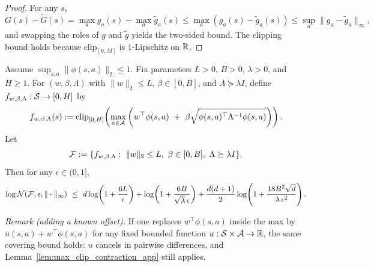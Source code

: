 \begin{proof}
For any $s$,
\[
G(s)-\tilde G(s)=\max_a g_a(s)-\max_a\tilde g_a(s)
\le \max_a (g_a(s)-\tilde g_a(s))
\le \sup_a \|g_a-\tilde g_a\|_\infty,
\]
and swapping the roles of $g$ and $\tilde g$ yields the two-sided bound.
The clipping bound holds because $\mathrm{clip}_{[0,M]}$ is $1$-Lipschitz on $\mathbb{R}$.
\end{proof}

\begin{lemma}\label{lem:cover_optimistic_value_class_app}
Assume $\sup_{s,a}\|\phi(s,a)\|_2\le 1$.
Fix parameters $L>0$, $B>0$, $\lambda>0$, and $H\ge 1$.
For $(w,\beta,\Lambda)$ with $\|w\|_2\le L$, $\beta\in[0,B]$, and $\Lambda\succeq \lambda I$,
define $f_{w,\beta,\Lambda}:\mathcal{S}\to[0,H]$ by
\[
f_{w,\beta,\Lambda}(s)
:=
\mathrm{clip}_{[0,H]}\!\left(
\max_{a\in\mathcal{A}}\left(
w^\top\phi(s,a)\ +\ \beta\sqrt{\phi(s,a)^\top \Lambda^{-1}\phi(s,a)}
\right)
\right).
\]
Let
\[
\mathcal{F}
:=
\{f_{w,\beta,\Lambda}:\ \|w\|_2\le L,\ \beta\in[0,B],\ \Lambda\succeq \lambda I\}.
\]
Then for any $\epsilon\in(0,1]$,
\[
\log \mathcal{N}(\mathcal{F},\epsilon,\|\cdot\|_\infty)
\ \le\
d\log\!\left(1+\frac{6L}{\epsilon}\right)
+\log\!\left(1+\frac{6B}{\sqrt{\lambda}\,\epsilon}\right)
+\frac{d(d+1)}{2}\log\!\left(1+\frac{18B^2\sqrt d}{\lambda\,\epsilon^2}\right).
\]

\smallskip
\noindent
\emph{Remark (adding a known offset).}
If one replaces $w^\top\phi(s,a)$ inside the max by $u(s,a)+w^\top\phi(s,a)$ for any
fixed bounded function $u:\mathcal{S}\times\mathcal{A}\to\mathbb{R}$, the same covering bound holds:
$u$ cancels in pairwise differences, and Lemma~\ref{lem:max_clip_contraction_app} still applies.
\end{lemma}

